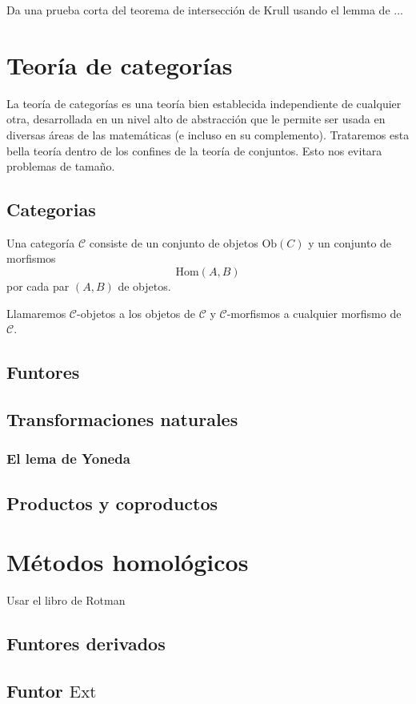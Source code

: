 \documentclass[b5paper,10pt]{book}
\begin{document}
\begin{problema}
Da una prueba corta del teorema de intersección de Krull usando el
lemma de ... 
\end{problema}

\chapter{Teoría de categorías}

La teoría de categorías 
es una teoría bien establecida 
independiente de cualquier otra,
desarrollada en un nivel alto de abstracción
que le permite ser usada en diversas áreas 
de las matemáticas (e incluso en su complemento).
Trataremos esta bella teoría dentro de los confines
de la teoría de conjuntos.
Esto nos evitara problemas de tamaño.

\section{Categorias}

\begin{defi}
Una categoría \(\mathcal{C}\) consiste de un conjunto de objetos
\(\mathrm{Ob}(C)\) y un conjunto de morfismos
\[
\mathrm{Hom}(A,B)
\]
por cada par \((A,B)\) de objetos.
\end{defi}

Llamaremos \(\mathcal{C}\)-objetos a los 
objetos de \(\mathcal{C}\) y \(\mathcal{C}\)-morfismos a 
cualquier morfismo de \(\mathcal{C}\).

\section{Funtores}
\section{Transformaciones naturales}


\subsection{El lema de Yoneda}

\section{Productos y coproductos}

\chapter{Métodos homológicos}
Usar el libro de Rotman

\section{Funtores derivados}

\section{Funtor \(\mathrm{Ext}\)}
\end{document}
